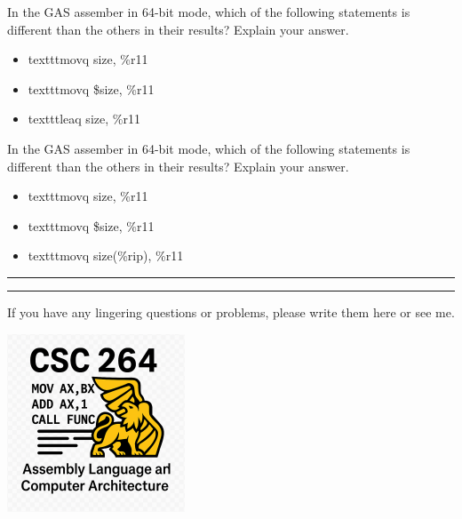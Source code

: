\documentclass[letterpaper,12pt]{exam}
\begin{document}
\begin{questions}
 \begin{samepage}
     \question In the GAS assember in 64-bit mode, which of the following statements is different than the others in their results?  Explain your answer.
     \begin{itemize}
             \item{texttt{movq size, \%r11}}
            \item {texttt{movq \$size, \%r11}}
            \item {texttt{leaq size, \%r11}}
           \end{itemize}
     \vspace{5mm}
 \end{samepage}
     \question In the GAS assember in 64-bit mode, which of the following statements is different than the others in their results?  Explain your answer.

 \begin{itemize}
             \item{texttt{movq size, \%r11}}
            \item {texttt{movq \$size, \%r11}}
            \item {texttt{movq size(\%rip), \%r11}}
        \end{itemize}
            \vspace{5mm}
 \par
 \rule{0.5\textwidth}{.4pt} %
\end{questions} 
\begin{center}
    \rule{0.667\textwidth}{.8pt} %
\end{center}


If you have any lingering questions or problems, please write them here or see me.
\vfill
\begin{center}
\includegraphics{../csc264Logo}
\end{center}
\end{document}
